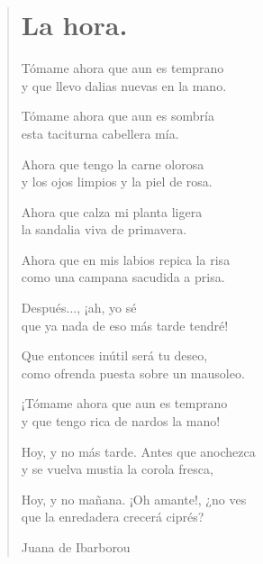 \documentclass[12pt, twoside]{book}
\begin{document}
\begin{verse}
\begin{center}
\section{La hora.}
\end{center}
Tómame ahora que aun es temprano\\
y que llevo dalias nuevas en la mano.\newline

Tómame ahora que aun es sombría\\
esta taciturna cabellera mía.\newline

Ahora que tengo la carne olorosa\\
y los ojos limpios y la piel de rosa.\newline

Ahora que calza mi planta ligera\\
la sandalia viva de primavera.\newline

Ahora que en mis labios repica la risa\\
como una campana sacudida a prisa.\newline

Después..., ¡ah, yo sé\\
que ya nada de eso más tarde tendré!\newline

Que entonces inútil será tu deseo,\\
como ofrenda puesta sobre un mausoleo.\newline

¡Tómame ahora que aun es temprano\\
y que tengo rica de nardos la mano!\newline

Hoy, y no más tarde. Antes que anochezca\\
y se vuelva mustia la corola fresca,\newline

Hoy, y no mañana. ¡Oh amante!, ¿no ves\\
que la enredadera crecerá ciprés?\newline

Juana de Ibarborou
\end{verse}
\newpage
\end{document}
